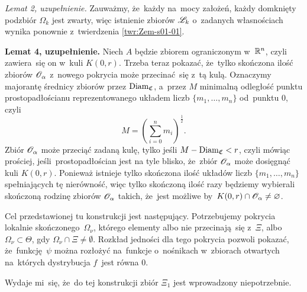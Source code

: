 \documentclass[a4paper,11pt]{article}
\begin{document}
\vspace{\spaceFour}



\start {} \textit{Lemat 2, uzupełnienie.} Zauważmy, że~każdy na~mocy
założeń, każdy domknięty podzbiór $\Omega_{ k }$ jest zwarty, więc
istnienie zbiorów $\mathcal{L}_{ k }$ o~zadanych własnościach wynika ponownie
z~twierdzenia \eqref{twr:Zem-s01-01}.

\vspace{\spaceFour}



\start {} \textbf{Lemat 4, uzupełnienie.} Niech $A$ będzie zbiorem
ograniczonym w~$\mathbb{R}^{ n }$, czyli zawiera~się on w~kuli $K( 0, r )$. Trzeba
teraz pokazać, że~tylko skończona ilość zbiorów $\mathcal{O}_{ \alpha }$ z~nowego
pokrycia może przecinać~się z~tą kulą. Oznaczymy majorantę średnicy
zbiorów przez $\textrm{Diam}_{ \mathfrak{C} }$, a~przez $M$ minimalną
odległość punktu prostopadłościanu reprezentowanego układem liczb
$\{ m_{ 1 }, \ldots, m_{ n } \}$ od~punktu $0$, czyli
\begin{equation}
  \label{eq:Zem-s01-06}
  M = \left( \sum_{ i = 0 }^{ n } m_{ i } \right)^{ \frac{ 1 }{ 2 } }.
\end{equation}
Zbiór $\mathcal{O}_{ \alpha }$ może przeciąć zadaną kulę, tylko jeśli
$M - \textrm{Diam}_{ \mathfrak{C} } < r$, czyli mówiąc prościej,
jeśli~prostopadłościan jest na tyle blisko, że~zbiór $\mathcal{O}_{ \alpha }$
może dosięgnąć kuli $K( 0, r )$. Ponieważ istnieje tylko skończona
ilość układów liczb $\{ m_{ 1 }, \ldots, m_{ n } \}$ spełniających tę
nierówność, więc tylko skończoną ilość razy będziemy wybierali
skończoną rodzinę zbiorów $\mathcal{O}_{ \alpha }$ takich, że~jest możliwe
by~$K( 0, r ) \cap \mathcal{O}_{ \alpha } \neq \varnothing$.

\vspace{\spaceFour}



\start {} Cel przedstawionej tu konstrukcji jest następujący.
Potrzebujemy pokrycia lokalnie skończonego~$\Omega_{ \nu }$, którego
elementy albo nie przecinają~się z~$\Xi$, albo
$\Omega_{ \nu } \subset \Theta$, gdy $\Omega_{ \nu } \cap \Xi \neq \emptyset$.
Rozkład jedności dla tego pokrycia pozwoli pokazać, że~funkcję~$\psi$
można rozłożyć na~funkcje o~nośnikach w~zbiorach otwartych na~których
dystrybucja $f$~jest równa $0$.

Wydaje mi~się, że~do tej konstrukcji zbiór $\Xi_{ 1 }$ jest
wprowadzony niepotrzebnie.

\vspace{\spaceFour}
\end{document}
